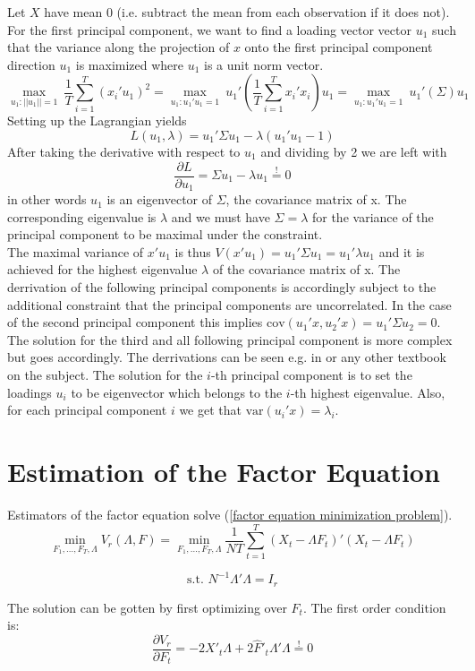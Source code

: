 \documentclass[12pt]{article}
\begin{document}
Let $X$ have mean 0 (i.e. subtract the mean from each observation if it does not).
For the first principal component, we want to find a loading vector vector $u_1$ such that the variance along the projection of $x$ onto the first principal component direction $u_1$ is maximized where $u_1$ is a unit norm vector. 
$$\underset{u_1: ||u_1|| = 1}{\max} \ \frac{1}{T} \sum_{i=1}^T(x_i'u_1)^2 = \underset{u_1: u_1'u_1 = 1}{\max} \ u_1' ( \frac{1}{T} \sum_{i=1}^T x_i'x_i )u_1 = \underset{u_1: u_1'u_1 = 1}{\max} \ u_1' (\Sigma)u_1$$
Setting up the Lagrangian yields
$$ L(u_1, \lambda) = u_1' \Sigma u_1 - \lambda(u_1'u_1-1)$$
After taking the derivative with respect to $u_1$ and dividing by 2 we are left with
$$\frac{\partial L}{\partial u_1} = \Sigma u_1 -\lambda u_1 \overset{!}{=} 0$$ in other words $u_1$ is an eigenvector of $\Sigma$, the covariance matrix of x. The corresponding eigenvalue is $\lambda$ and we must have $\Sigma = \lambda$ for the variance of the principal component to be maximal under the constraint. \\
The maximal variance of $x'u_1$ is thus $V(x'u_1) = u_1' \Sigma u_1 = u_1' \lambda u_1$ and it is achieved for the highest eigenvalue $\lambda$ of the covariance matrix of x. The derrivation of the following principal components is accordingly subject to the additional constraint that the principal components are uncorrelated. In the case of the second principal component this implies $\text{cov}(u_1'x, u_2'x) = u_1' \Sigma u_2 = 0$. The solution for the third and all following principal component is more complex but goes accordingly. The derrivations can be seen e.g. in \citet{jolliffe2005principal} or any other textbook on the subject. The solution for the $i$-th principal component is to set the loadings $u_i$ to be eigenvector which belongs to the $i$-th highest eigenvalue. Also, for each principal component $i$ we get that $\text{var}(u_i'x) = \lambda_i$.

\newpage
\section{Estimation of the Factor Equation}
\label{Estimation of the Factor Equation}
Estimators of the factor equation solve (\ref{factor equation minimization problem}).
$$\min_{F_1, ..., F_T, \Lambda} V_r(\Lambda, F) = \min_{F_1, ..., F_T, \Lambda} \frac{1}{NT} \sum_{t=1}^T (X_t - \Lambda F_t)'(X_t - \Lambda F_t)$$

$$\text{s.t. } N^{-1} \Lambda' \Lambda = I_r$$

The solution can be gotten by first optimizing over $F_t$. The first order condition is: $$\frac{\partial V_r}{\partial F_t} = -2X'_t \Lambda + 2 \hat F'_t \Lambda' \Lambda \overset{!}{=} 0$$
\end{document}
